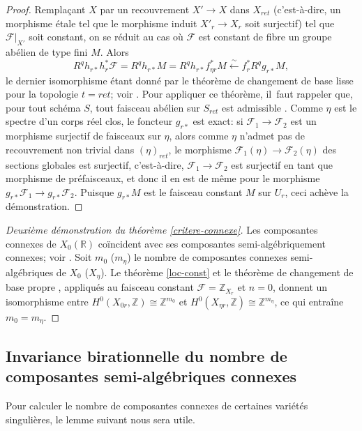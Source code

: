 \documentclass[JEP,XML,SOM,Unicode,francais,published]{cedram}
\newcommand{\isofrom}{\stackrel{\sim}{\longleftarrow}}
\theoremstyle{definition}
\newcommand{\Z}{\mathbb Z}
\newcommand{\R}{\mathbb R}
\newcommand{\mc}[1]{\mathcal{#1}}
\begin{document}
\begin{proof}
Remplaçant $X$ par un recouvrement $X'\to X$ dans $X_{ret}$ (c'est-à-dire, un morphisme étale tel que le morphisme induit $X'_r\to X_r$ soit surjectif) tel que $\mc{F}|_{X'}$ soit constant, on se réduit au cas où $\mc{F}$ est constant de fibre un groupe abélien de type fini $M$. Alors\vspace*{-3pt}
\[ R^q h_{r*} h_r^* \mc{F} = R^q h_{r*} M = R^q h_{r*}f_{\eta r}^* M \isofrom f_r^* R^q g_{r*} M, \]
le dernier isomorphisme étant donné par le théorème de changement de base lisse pour la topologie $t=ret$; voir
\cite[Th.\,16.11]{scheiderer1994real}. Pour appliquer ce théorème, il~faut rappeler que, pour tout schéma $S$, tout faisceau abélien sur $S_{ret}$ est admissible \cite[Def.\,16.4.1(a)]{scheiderer1994real}. Comme $\eta$ est le spectre d'un corps réel clos, le foncteur $g_{r*}$ est exact: si $\mc{F}_1\to \mc{F}_2$ est un morphisme surjectif de faisceaux sur $\eta$, alors comme $\eta$ n'admet pas de recouvrement non trivial dans $(\eta)_{ret}$, le morphisme $\mc{F}_1(\eta)\to \mc{F}_2(\eta)$ des sections globales est surjectif, c'est-à-dire, $\mc{F}_1\to \mc{F}_2$ est surjectif en tant que morphisme de préfaisceaux, et donc il en est de même pour le morphisme $g_{r*}\mc{F}_1\to g_{r*} \mc{F}_2$. Puisque $g_{r*}M$ est le faisceau constant $M$ sur $U_r$, ceci achève la démonstration.
\end{proof}

\begin{proof}[Deuxième démonstration du théorème \ref{critere-connexe}]
Les composantes connexes de $X_0(\R)$ coïncident avec ses composantes semi-algébriquement connexes; voir \cite[Th.\,2.4.5]{bochnak1987geometrie}. Soit $m_0$ (\resp $m_\eta$) le nombre de composantes connexes semi-algébriques de $X_0$ (\resp $X_\eta$). Le théorème \ref{loc-const} et le théorème de changement de base propre \cite[Th.\,16.2 ($t=ret$)]{scheiderer1994real}, appliqués au faisceau constant $\mc{F}=\Z_{X_r}$ et $n=0$, donnent un isomorphisme entre $H^0(X_{0r},\Z)\cong \Z^{m_0}$ et $H^0(X_{\eta r},\Z)\cong\Z^{m_\eta}$, ce qui entraîne $m_0=m_\eta$.
\end{proof}

\subsection{Invariance birationnelle du nombre de composantes semi-algébriques connexes} Pour calculer le nombre de composantes connexes de certaines variétés singulières, le lemme suivant nous sera utile.
\end{document}
